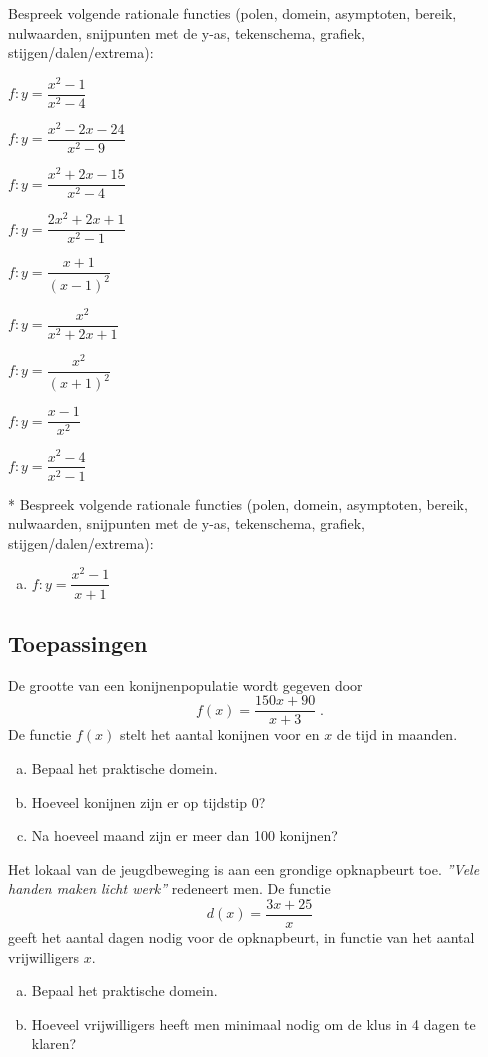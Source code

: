\documentclass[12pt,twoside,a4paper]{article}
\begin{document}
\begin{oefening}
Bespreek volgende rationale functies (polen, domein, asymptoten, bereik, nulwaarden, snijpunten met de y-as, tekenschema, grafiek, stijgen/dalen/extrema):
\begin{exlist}{2}
  \item $f:y=\dfrac{x^2-1}{x^2-4}$
  \item $f:y=\dfrac{x^2-2x-24}{x^2-9}$
  \item $f:y=\dfrac{x^2+2x-15}{x^2-4}$
  \item $f:y=\dfrac{2x^2+2x+1}{x^2-1}$
  \item $f:y=\dfrac{x+1}{(x-1)^2}$
  \item $f:y=\dfrac{x^2}{x^2+2x+1}$
  \item $f:y=\dfrac{x^2}{(x+1)^2}$
  \item $f:y=\dfrac{x-1}{x^2}$
  \item $f:y=\dfrac{x^2-4}{x^2-1}$
\end{exlist}
\end{oefening}

\begin{oefening}*
Bespreek volgende rationale functies (polen, domein, asymptoten, bereik, nulwaarden, snijpunten met de y-as, tekenschema, grafiek, stijgen/dalen/extrema):
\begin{enumerate}[(a)]
  \itemsep0.6em
  \item $f:y=\dfrac{x^2-1}{x+1}$
\end{enumerate}
\end{oefening}

\subsection{Toepassingen}


\begin{oefening}
De grootte van een konijnenpopulatie wordt gegeven door
$$f(x)=\dfrac{150x+90}{x+3}\;.$$
De functie $f(x)$ stelt het aantal konijnen voor en $x$ de tijd in maanden.
\begin{enumerate}[(a)]
  \item Bepaal het praktische domein.
  \item Hoeveel konijnen zijn er op tijdstip 0?
  \item Na hoeveel maand zijn er meer dan 100 konijnen?
\end{enumerate}
\end{oefening}

\begin{oefening}
Het lokaal van de jeugdbeweging is aan een grondige opknapbeurt toe. {\em ''Vele handen maken licht werk''} redeneert men. De functie
$$d(x)=\dfrac{3x+25}{x}$$
geeft het aantal dagen nodig voor de opknapbeurt, in functie van het aantal vrijwilligers $x$.
\begin{enumerate}[(a)]
  \item Bepaal het praktische domein.
  \item Hoeveel vrijwilligers heeft men minimaal nodig om de klus in 4 dagen te klaren?
\end{enumerate}
\end{oefening}
\end{document}
